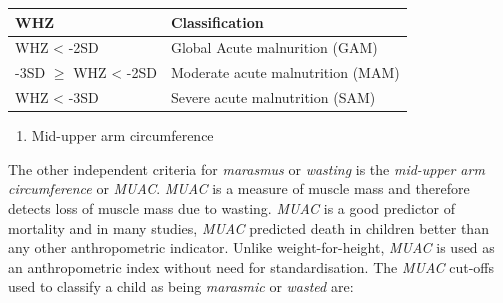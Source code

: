 \documentclass[12pt,]{book}
\providecommand{\tightlist}{%
  \setlength{\itemsep}{0pt}\setlength{\parskip}{0pt}}
\begin{document}
\begin{longtable}[]{@{}ll@{}}
\toprule
\begin{minipage}[b]{0.34\columnwidth}\raggedright
\textbf{WHZ}\strut
\end{minipage} & \begin{minipage}[b]{0.47\columnwidth}\raggedright
\textbf{Classification}\strut
\end{minipage}\tabularnewline
\midrule
\endhead
\begin{minipage}[t]{0.34\columnwidth}\raggedright
WHZ \textless{} -2SD\strut
\end{minipage} & \begin{minipage}[t]{0.47\columnwidth}\raggedright
Global Acute malnurition (GAM)\strut
\end{minipage}\tabularnewline
\begin{minipage}[t]{0.34\columnwidth}\raggedright
-3SD \(\geq\) WHZ \textless{} -2SD\strut
\end{minipage} & \begin{minipage}[t]{0.47\columnwidth}\raggedright
Moderate acute malnutrition (MAM)\strut
\end{minipage}\tabularnewline
\begin{minipage}[t]{0.34\columnwidth}\raggedright
WHZ \textless{} -3SD\strut
\end{minipage} & \begin{minipage}[t]{0.47\columnwidth}\raggedright
Severe acute malnutrition (SAM)\strut
\end{minipage}\tabularnewline
\bottomrule
\end{longtable}

\begin{enumerate}
\def\labelenumi{\arabic{enumi}.}
\setcounter{enumi}{1}
\tightlist
\item
  Mid-upper arm circumference
\end{enumerate}

The other independent criteria for \emph{marasmus} or \emph{wasting} is
the \emph{mid-upper arm circumference} or \emph{MUAC}. \emph{MUAC} is a
measure of muscle mass and therefore detects loss of muscle mass due to
wasting. \emph{MUAC} is a good predictor of mortality and in many
studies, \emph{MUAC} predicted death in children better than any other
anthropometric indicator. Unlike weight-for-height, \emph{MUAC} is used
as an anthropometric index without need for standardisation. The
\emph{MUAC} cut-offs used to classify a child as being \emph{marasmic}
or \emph{wasted} are:
\end{document}
